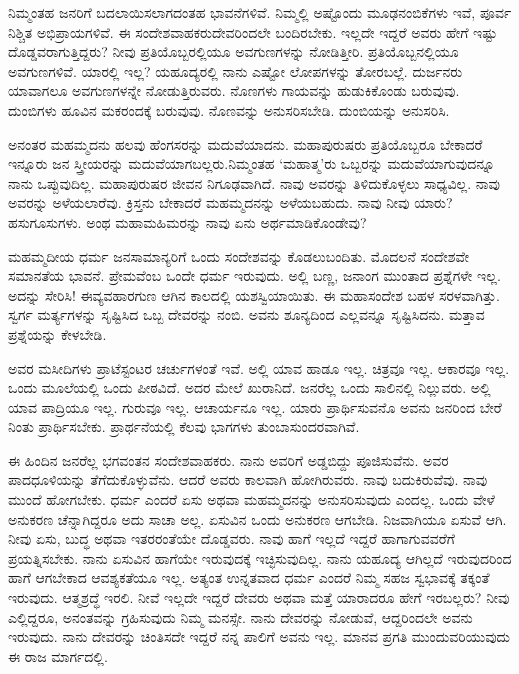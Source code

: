 ನಿಮ್ಮಂತಹ ಜನರಿಗೆ ಬದಲಾಯಿಸಲಾಗದಂತಹ ಭಾವನೆಗಳಿವೆ. ನಿಮ್ಮಲ್ಲಿ ಅಷ್ಟೊಂದು ಮೂಢನಂಬಿಕೆಗಳು ಇವೆ, ಪೂರ್ವ ನಿಶ್ಚಿತ ಅಭಿಪ್ರಾಯಗಳಿವೆ. ಈ ಸಂದೇಶವಾಹಕರು\break ದೇವರಿಂದಲೇ ಬಂದಿರಬೇಕು. ಇಲ್ಲದೇ ಇದ್ದರೆ ಅವರು ಹೇಗೆ ಇಷ್ಟು ದೊಡ್ಡವರಾಗುತ್ತಿದ್ದರು? ನೀವು ಪ್ರತಿಯೊಬ್ಬರಲ್ಲಿಯೂ ಅವಗುಣಗಳನ್ನು ನೋಡಿತ್ತೀರಿ. ಪ್ರತಿಯೊಬ್ಬನಲ್ಲಿಯೂ ಅವಗುಣಗಳಿವೆ. ಯಾರಲ್ಲಿ ಇಲ್ಲ? ಯಹೂದ್ಯರಲ್ಲಿ ನಾನು ಎಷ್ಟೋ ಲೋಪಗಳನ್ನು ತೋರಬಲ್ಲೆ. ದುರ್ಜನರು ಯಾವಾಗಲೂ ಅವಗುಣಗಳನ್ನೇ ನೋಡುತ್ತಿರುವರು. ನೊಣಗಳು ಗಾಯವನ್ನು ಹುಡುಕಿಕೊಂಡು ಬರುವುವು. ದುಂಬಿಗಳು ಹೂವಿನ ಮಕರಂದಕ್ಕೆ ಬರುವುವು. ನೊಣವನ್ನು ಅನುಸರಿಸಬೇಡಿ. ದುಂಬಿಯನ್ನು ಅನುಸರಿಸಿ.

ಅನಂತರ ಮಹಮ್ಮದನು ಹಲವು ಹೆಂಗಸರನ್ನು ಮದುವೆಯಾದನು. ಮಹಾಪುರು\-ಷರು ಪ್ರತಿಯೊಬ್ಬರೂ ಬೇಕಾದರೆ ಇನ್ನೂರು ಜನ ಸ್ತ್ರೀಯರನ್ನು ಮದುವೆಯಾಗಬಲ್ಲರು.\break ನಿಮ್ಮಂತಹ ‘ಮಹಾತ್ಮ’ರು ಒಬ್ಬರನ್ನು ಮದುವೆಯಾಗುವುದನ್ನೂ ನಾನು ಒಪ್ಪುವುದಿಲ್ಲ. ಮಹಾಪುರುಷರ ಜೀವನ ನಿಗೂಢವಾಗಿದೆ. ನಾವು ಅವರನ್ನು ತಿಳಿದುಕೊಳ್ಳಲು ಸಾಧ್ಯವಿಲ್ಲ. ನಾವು ಅವರನ್ನು ಅಳೆಯಲಾರೆವು. ಕ್ರಿಸ್ತನು ಬೇಕಾದರೆ ಮಹಮ್ಮದನನ್ನು ಅಳೆಯಬಹುದು. ನಾವು ನೀವು ಯಾರು? ಹಸುಗೂಸುಗಳು. ಅಂಥ ಮಹಾಮಹಿಮರನ್ನು ನಾವು ಏನು ಅರ್ಥಮಾಡಿಕೊಂಡೇವು?

ಮಹಮ್ಮದೀಯ ಧರ್ಮ ಜನಸಾಮಾನ್ಯರಿಗೆ ಒಂದು ಸಂದೇಶವನ್ನು ಕೊಡಲು\break ಬಂದಿತು. ಮೊದಲನೆ ಸಂದೇಶವೇ ಸಮಾನತೆಯ ಭಾವನೆ. ಪ್ರೇಮವೆಂಬ ಒಂದೇ ಧರ್ಮ ಇರುವುದು. ಅಲ್ಲಿ ಬಣ್ಣ, ಜನಾಂಗ ಮುಂತಾದ ಪ್ರಶ್ನೆಗಳೇ ಇಲ್ಲ. ಅದನ್ನು ಸೇರಿಸಿ! ಈ\break ವ್ಯವಹಾರಗುಣ ಆಗಿನ ಕಾಲದಲ್ಲಿ ಯಶಸ್ವಿಯಾಯಿತು. ಈ ಮಹಾಸಂದೇಶ ಬಹಳ ಸರಳ\-ವಾಗಿತ್ತು. ಸ್ವರ್ಗ ಮರ್ತ್ಯಗಳನ್ನು ಸೃಷ್ಟಿಸಿದ ಒಬ್ಬ ದೇವರನ್ನು ನಂಬಿ. ಅವನು ಶೂನ್ಯದಿಂದ ಎಲ್ಲವನ್ನೂ ಸೃಷ್ಟಿಸಿದನು. ಮತ್ತಾವ ಪ್ರಶ್ನೆಯನ್ನು ಕೇಳಬೇಡಿ.

ಅವರ ಮಸೀದಿಗಳು ಪ್ರಾಟೆಸ್ಟಂಟರ ಚರ್ಚುಗಳಂತೆ ಇವೆ. ಅಲ್ಲಿ ಯಾವ ಹಾಡೂ ಇಲ್ಲ. ಚಿತ್ರವೂ ಇಲ್ಲ. ಆಕಾರವೂ ಇಲ್ಲ. ಒಂದು ಮೂಲೆಯಲ್ಲಿ ಒಂದು ಪೀಠವಿದೆ. ಅದರ ಮೇಲೆ ಖುರಾನಿದೆ. ಜನರೆಲ್ಲ ಒಂದು ಸಾಲಿನಲ್ಲಿ ನಿಲ್ಲುವರು. ಅಲ್ಲಿ ಯಾವ ಪಾದ್ರಿಯೂ ಇಲ್ಲ. ಗುರುವೂ ಇಲ್ಲ. ಆಚಾರ್ಯನೂ ಇಲ್ಲ. ಯಾರು ಪ್ರಾರ್ಥಿಸುವನೊ ಅವನು ಜನರಿಂದ ಬೇರೆ ನಿಂತು ಪ್ರಾರ್ಥಿಸಬೇಕು. ಪ್ರಾರ್ಥನೆಯಲ್ಲಿ ಕೆಲವು ಭಾಗಗಳು ತುಂಬಾ\break ಸುಂದರವಾಗಿವೆ.

ಈ ಹಿಂದಿನ ಜನರೆಲ್ಲ ಭಗವಂತನ ಸಂದೇಶವಾಹಕರು. ನಾನು ಅವರಿಗೆ ಅಡ್ಡಬಿದ್ದು ಪೂಜಿಸುವೆನು. ಅವರ ಪಾದಧೂಳಿಯನ್ನು ತೆಗೆದುಕೊಳ್ಳುವೆನು. ಆದರೆ ಅವರು ಕಾಲವಾಗಿ ಹೋಗಿರುವರು. ನಾವು ಬದುಕಿರುವೆವು. ನಾವು ಮುಂದೆ ಹೋಗಬೇಕು. ಧರ್ಮ ಎಂದರೆ ಏಸು ಅಥವಾ ಮಹಮ್ಮದನನ್ನು ಅನುಸರಿಸುವುದು ಎಂದಲ್ಲ. ಒಂದು ವೇಳೆ ಅನುಕರಣ ಚೆನ್ನಾಗಿದ್ದರೂ ಅದು ಸಾಚಾ ಅಲ್ಲ. ಏಸುವಿನ ಒಂದು ಅನುಕರಣ ಆಗಬೇಡಿ. ನಿಜವಾಗಿಯೂ ಏಸುವೆ ಆಗಿ. ನೀವು ಏಸು, ಬುದ್ಧ ಅಥವಾ ಇತರರಂತೆಯೇ ದೊಡ್ಡವರು. ನಾವು ಹಾಗೆ ಇಲ್ಲದೆ ಇದ್ದರೆ ಹಾಗಾಗುವವರೆಗೆ ಪ್ರಯತ್ನಿಸಬೇಕು. ನಾನು ಏಸುವಿನ ಹಾಗೆಯೇ ಇರುವುದಕ್ಕೆ ಇಚ್ಛಿಸುವುದಿಲ್ಲ. ನಾನು ಯಹೂದ್ಯ ಆಗಿಲ್ಲದೆ ಇರುವುದರಿಂದ ಹಾಗೆ ಆಗಬೇಕಾದ ಆವಶ್ಯಕತೆಯೂ ಇಲ್ಲ. ಅತ್ಯಂತ ಉನ್ನತವಾದ ಧರ್ಮ ಎಂದರೆ ನಿಮ್ಮ ಸಹಜ ಸ್ವಭಾವಕ್ಕೆ ತಕ್ಕಂತೆ ಇರುವುದು. ಆತ್ಮಶ್ರದ್ಧೆ ಇರಲಿ. ನೀವೆ ಇಲ್ಲದೇ ಇದ್ದರೆ ದೇವರು ಅಥವಾ ಮತ್ತೆ ಯಾರಾದರೂ ಹೇಗೆ ಇರಬಲ್ಲರು? ನೀವು ಎಲ್ಲಿದ್ದರೂ, ಅನಂತವನ್ನು ಗ್ರಹಿಸುವುದು ನಿಮ್ಮ ಮನಸ್ಸೇ. ನಾನು ದೇವರನ್ನು ನೋಡುವೆ, ಆದ್ದರಿಂದಲೇ ಅವನು ಇರುವುದು. ನಾನು ದೇವರನ್ನು ಚಿಂತಿಸದೇ ಇದ್ದರೆ ನನ್ನ ಪಾಲಿಗೆ ಅವನು ಇಲ್ಲ. ಮಾನವ ಪ್ರಗತಿ ಮುಂದುವರಿಯುವುದು ಈ ರಾಜ ಮಾರ್ಗದಲ್ಲಿ.

